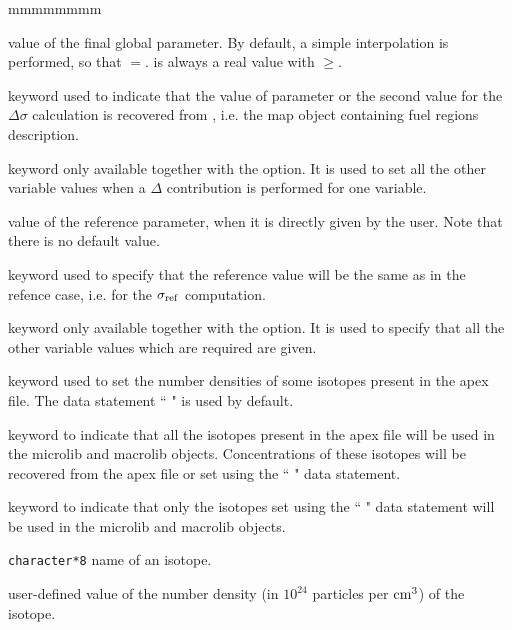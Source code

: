 \begin{ListeDeDescription}{mmmmmmmm}
\item[\dusa{val2}] value of the final global parameter. By default, a simple interpolation is performed, so that $=$.  is always a real value with $\ge$.

\item[\moc{MAP}] keyword used to indicate that the value of parameter  or the second value for the $\Delta\sigma$ calculation is
recovered from , i.e. the {\sc map} object containing fuel regions description.

\item[\moc{REF}] keyword only available together with the  option. It is used to set all the other variable values when a $\Delta$ contribution is performed for one variable.  

\item[\dusa{valref}] value of the reference parameter, when it is directly given by the user. Note that there is no default value.

\item[\moc{SAMEASREF}] keyword used to specify that the reference value will be the same as in the refence case, i.e. for the $\sigma_{\rm ref}$ computation.

\item[\moc{ENDREF}] keyword only available together with the  option. It is used to specify that all the other variable values which are required are given.  

\item[\moc{MICRO}] keyword used to set the number densities of some isotopes present in the {\sc apex} file. The data statement `` " is used by default.

\item[\moc{ALL}] keyword to indicate that all the isotopes present in the {\sc apex} file will be used in the {\sc microlib} and {\sc macrolib} objects. Concentrations of these isotopes will be recovered from the {\sc apex} file or set using
the `` " data statement.

\item[\moc{ONLY}] keyword to indicate that only the isotopes set using the `` " data statement will be used in the {\sc microlib} and {\sc macrolib} objects.

\item[\dusa{HISO}] {\tt character*8} name of an isotope.

\item[\dusa{conc}] user-defined value of the number density (in $10^{24}$ particles per ${\rm cm}^3$) of the isotope.


\end{ListeDeDescription}
